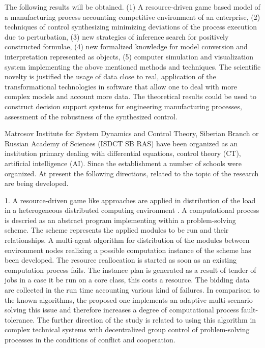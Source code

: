 \documentclass[runningheads]{llncs}
\begin{document}

The following results will be obtained. (1) A resource-driven game based model of a manufacturing process accounting competitive environment of an enterprise, (2) techniques of control synthesizing minimizing deviations of the process execution due to perturbation, (3) new strategies of inference search for positively constructed formulae, (4) new formalized knowledge for model conversion and interpretation represented as objects, (5) computer simulation and visualization system implementing the above mentioned methods and techniques. The scientific novelty is justified the usage of data close to real, application of the transformational technologies in software that allow one to deal with more complex models and account more data.
The theoretical results could be used to construct decision support systems for engineering manufacturing processes, assessment of the robustness of the synthesized control.


Matrosov Institute for System Dynamics and Control Theory, Siberian Branch or Russian Academy of Sciences (ISDCT SB RAS) have been organized as an institution primary dealing with differential equations, control theory (CT), artificial intelligence (AI). Since the establishment a number of schools were organized. At present the following directions, related to the topic of the research are being developed.

    1. A resource-driven game like approaches are applied in distribution of the load in a heterogeneous distributed computing environment \cite{b1}. A computational process is descried as an abstract program implementing within a problem-solving scheme. The scheme represents the applied modules to be run and their relationships. A multi-agent algorithm for distribution of the modules between environment nodes realizing a possible computation instance of the scheme has been developed. The resource reallocation is started as soon as an existing computation process fails. The instance plan is generated as a result of tender of jobs in a case it be run on a core class, this costs a resource. The bidding data are collected in the run time accounting various kind of failures. In comparison to the known algorithms, the proposed one implements an adaptive multi-scenario solving this issue and therefore increases a degree of computational process fault-tolerance. The further direction of the study is related to using this algorithm in complex technical systems with decentralized group control of problem-solving processes in the conditions of conflict and cooperation.
\end{document}
